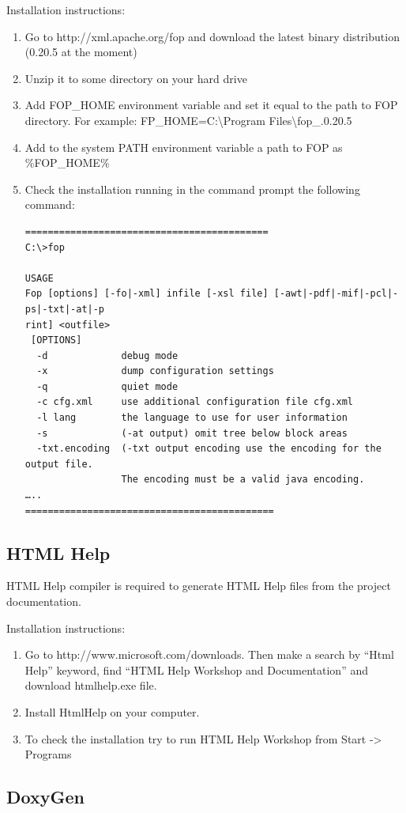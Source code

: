 \documentclass[a4paper,12pt,oneside]{book}
\begin{document}
Installation instructions:
\begin{enumerate}
  \item Go to http://xml.apache.org/fop and download the latest binary distribution (0.20.5 at the moment)
	\item Unzip it to some directory on your hard drive
	\item 
	  Add FOP\_HOME environment variable and set it equal to the path to FOP directory.
		For example: FP\_HOME=C:\textbackslash Program Files\textbackslash fop\_.0.20.5
	\item Add to the system PATH environment variable a path to FOP as \%FOP\_HOME\%
	\item
	  Check the installation running in the command prompt the following command:
		\begin{verbatim}
===========================================
C:\>fop

USAGE
Fop [options] [-fo|-xml] infile [-xsl file] [-awt|-pdf|-mif|-pcl|-ps|-txt|-at|-p
rint] <outfile>
 [OPTIONS]
  -d             debug mode
  -x             dump configuration settings
  -q             quiet mode
  -c cfg.xml     use additional configuration file cfg.xml
  -l lang        the language to use for user information
  -s             (-at output) omit tree below block areas
  -txt.encoding  (-txt output encoding use the encoding for the output file.
                 The encoding must be a valid java encoding.
…..
============================================
    \end{verbatim}
\end{enumerate}

\subsection{HTML Help}
HTML Help compiler is required to generate HTML Help files from the project documentation.

Installation instructions:
\begin{enumerate}
  \item
	  Go to http://www.microsoft.com/downloads.
		Then make a search by “Html Help” keyword, find “HTML Help Workshop and Documentation” and download htmlhelp.exe file.
  \item Install HtmlHelp on your computer.
	\item To check the installation try to run HTML Help Workshop from Start -> Programs
\end{enumerate}

\subsection{DoxyGen}
\end{document}

